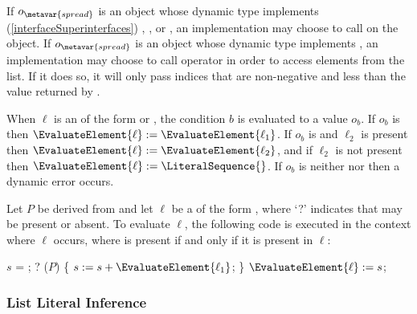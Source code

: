 \documentclass[makeidx]{article}
\begin{document}
{\LMHash{}%
If $o_{\metavar{spread}}$ is an object whose dynamic type implements
(\ref{interfaceSuperinterfaces})
, , or ,
an implementation may choose to call  on the object.
If $o_{\metavar{spread}}$ is an object whose dynamic type implements ,
an implementation may choose to call operator \lit{[]}
in order to access elements from the list.
If it does so, it will only pass indices
that are non-negative and less than the value returned by .

\EndCase

\LMHash{}%
When $\ell$ is an  of the form
 or
,
the condition $b$ is evaluated to a value $o_b$.
If $o_b$ is \TRUE{} then
$\EvaluateElement{\ell} := \EvaluateElement{\ell_1}$.
If $o_b$ is \FALSE{} and $\ell_2$ is present then
$\EvaluateElement{\ell} := \EvaluateElement{\ell_2}$,
and if $\ell_2$ is not present then
$\EvaluateElement{\ell} := \LiteralSequence{}$.
If $o_b$ is neither \TRUE{} nor \FALSE{} then a dynamic error occurs.
\EndCase

\LMHash{}%
Let $P$ be derived from  and
let $\ell$ be a  of the form
,
where `\AWAIT?' indicates that \AWAIT{} may be present or absent.
To evaluate $\ell$,
the following code is executed in the context where $\ell$ occurs,
where \AWAIT{} is present if and only if it is present in $\ell$:

\vspace{-2ex}\begin{minipage}[t]{\textwidth}
\begin{normativeDartCode}
\VAR{} $s$ = \LiteralSequence{};
\AWAIT? \FOR{} ($P$) \{
  $s := s + \EvaluateElement{\ell_1}$;
\}
$\EvaluateElement{\ell} := s$;
\end{normativeDartCode}
\end{minipage}
\EndCase


\subsubsection{List Literal Inference}

}
\end{document}
